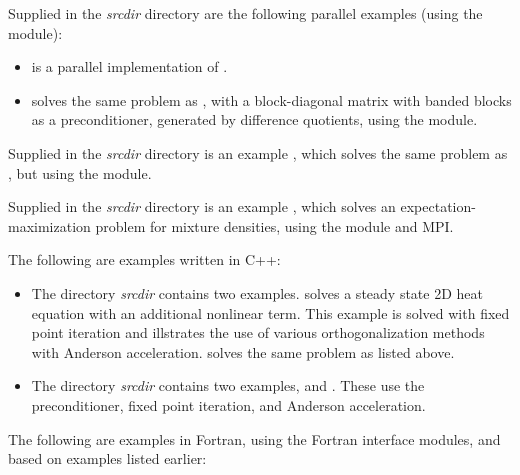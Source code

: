 \vspace{0.2in}\noindent
Supplied in the {\em srcdir} directory are
the following parallel examples (using the {\nvecp} module):
\begin{itemize}
\item {}
  is a parallel implementation of .
\item {}
  solves the same problem as , with a block-diagonal matrix
  with banded blocks as a preconditioner, generated by difference quotients,
  using the {\kinbbdpre} module.
\end{itemize}

\vspace{0.2in}\noindent
Supplied in the {\em srcdir} directory
is an example , which solves the same problem
as , but using the  {\nector} module.

\vspace{0.2in}\noindent
Supplied in the {\em srcdir} directory
is an example , which solves an
expectation-maximization problem for mixture densities, using the
 {\nvector} module and MPI.

\vspace{0.2in}\noindent 
The following are examples written in C++:
\begin{itemize}

\item The directory {\em srcdir}
  contains two examples.  solves a
  steady state 2D heat equation with an additional nonlinear term.
  This example is solved with fixed point iteration and illstrates
  the use of various orthogonalization methods with Anderson
  acceleration.
   solves the same problem as 
  listed above.

\item The directory {\em srcdir}
  contains two examples,  and
  .  These use the 
   preconditioner, fixed point iteration, and Anderson
  acceleration.

\end{itemize}
  
\vspace{0.2in}\noindent
The following are examples in Fortran, using the {\sundials}
Fortran interface modules, and based on examples listed earlier:

